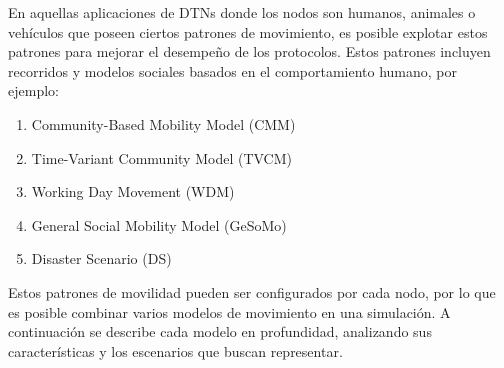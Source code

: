 En aquellas aplicaciones de DTNs donde los nodos son humanos, animales o vehículos que poseen ciertos patrones de movimiento, es posible explotar estos patrones para mejorar el desempeño de los protocolos. Estos patrones incluyen recorridos y modelos sociales basados en el comportamiento humano, por ejemplo:

\begin{enumerate}
	\item Community-Based Mobility Model (CMM)
	\item Time-Variant Community Model (TVCM)
	\item Working Day Movement (WDM)
	\item General Social Mobility Model (GeSoMo)
	\item Disaster Scenario (DS)
\end{enumerate}

Estos patrones de movilidad pueden ser configurados por cada nodo, por lo que es posible combinar varios modelos de movimiento en una simulación. A continuación se describe cada modelo en profundidad, analizando sus características y los escenarios que buscan representar.
